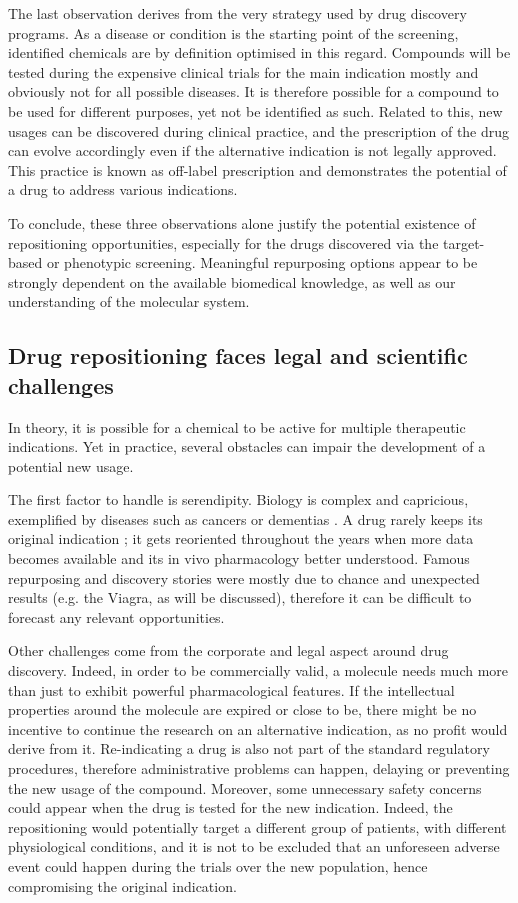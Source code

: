The last observation derives from the very strategy used by drug discovery programs. As a disease or condition is the starting point of the screening, identified chemicals are by definition optimised in this regard. Compounds will be tested during the expensive clinical trials for the main indication mostly and obviously not for all possible diseases. It is therefore possible for a compound to be used for different purposes, yet not be identified as such. Related to this, new usages can be discovered during clinical practice, and the prescription of the drug can evolve accordingly even if the alternative indication is not legally approved. This practice is known as off-label prescription \citep{offlabelwiki} and demonstrates the potential of a drug to address various indications.

To conclude, these three observations alone justify the potential existence of repositioning opportunities, especially for the drugs discovered via the target-based or phenotypic screening. Meaningful repurposing options appear to be strongly dependent on the available biomedical knowledge, as well as our understanding of the molecular system.

\subsection{Drug repositioning faces legal and scientific challenges}

In theory, it is possible for a chemical to be active for multiple therapeutic indications. Yet in practice, several obstacles can impair the development of a potential new usage.

The first factor to handle is serendipity. Biology is complex and capricious, exemplified by diseases such as cancers or dementias \cite{ashburn2004drug}. A drug rarely keeps its original indication \citep{barratt2012drug}; it gets reoriented throughout the years when more data becomes available and its in vivo pharmacology better understood. Famous repurposing and discovery stories were mostly due to chance and unexpected results (e.g. the Viagra, as will be discussed), therefore it can be difficult to forecast any relevant opportunities.

Other challenges come from the corporate and legal aspect around drug discovery. Indeed, in order to be commercially valid, a molecule needs much more than just to exhibit powerful pharmacological features. If the intellectual properties around the molecule are expired or close to be, there might be no incentive to continue the research on an alternative indication, as no profit would derive from it. Re-indicating a drug is also not part of the standard regulatory procedures, therefore administrative problems can happen, delaying or preventing the new usage of the compound. Moreover, some unnecessary safety concerns could appear when the drug is tested for the new indication. Indeed, the repositioning would potentially target a different group of patients, with different physiological conditions, and it is not to be excluded that an unforeseen adverse event could happen during the trials over the new population, hence compromising the original indication.

